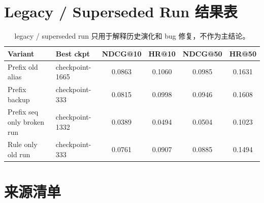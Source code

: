 \documentclass[a4paper]{article}
\begin{document}
\section{Legacy / Superseded Run 结果表}

\begin{table}[H]
\centering
\small
\begin{tabular}{p{4.2cm}p{1.7cm}cccc}
\toprule
Variant & Best ckpt & NDCG@10 & HR@10 & NDCG@50 & HR@50 \\
\midrule
Prefix old alias & checkpoint-1665 & 0.0863 & 0.1060 & 0.0985 & 0.1631 \\
Prefix backup & checkpoint-333 & 0.0815 & 0.0998 & 0.0946 & 0.1608 \\
Prefix seq only broken run & checkpoint-1332 & 0.0389 & 0.0494 & 0.0504 & 0.1023 \\
Rule only old run & checkpoint-333 & 0.0761 & 0.0907 & 0.0885 & 0.1494 \\
\bottomrule
\end{tabular}
\caption{legacy / superseded run 只用于解释历史演化和 bug 修复，不作为主结论。}
\end{table}

\section{来源清单}
\end{document}
